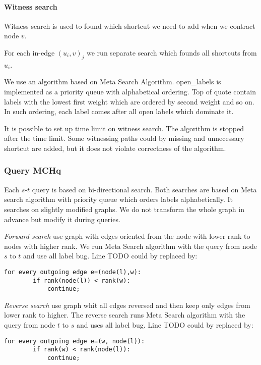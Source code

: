 \paragraph*{Witness search}

Witness search is used to found which shortcut we need to add when we contract 
node $v$.

For each in-edge $(u_i,v)_j$ we run separate search which founds all shortcuts 
from $u_i$.

We use an algorithm based on Meta Search Algorithm. 
open\_labels 
is implemented as a priority queue with alphabetical ordering. Top of quote contain labels with the lowest first weight which are ordered by second weight and so on. 
In such ordering, each label comes after all open labels which dominate it.

It is possible to set up time limit on witness search. The algorithm is stopped after the time limit. Some witnessing paths could by missing and unnecessary shortcut are added, but it does not violate correctness of the algorithm.

\subsubsection{Query MCHq}

Each $s$-$t$ query is based on bi-directional search.
Both searches are based on Meta search algorithm with priority queue which orders labels
alphabetically. It searches on slightly modified graphs. We do not transform the whole
graph in advance but modify it during queries.

\emph{Forward search} use graph with edges
oriented from the node with lower rank to nodes with higher rank.
We run Meta Search algorithm with the query from node $s$ to $t$ and use all label bug.
Line TODO could by replaced by:

\begin{lstlisting}[caption={MCHp},label=list:8-6,captionpos=t,float,abovecaptionskip=-\medskipamount]
    for every outgoing edge e=(node(l),w):
    	if rank(node(l)) < rank(w):
        	continue;
\end{lstlisting}

\emph{Reverse search} use graph whit all edges reversed and then keep only edges
from lower rank to higher. 
The reverse search runs Meta Search algorithm with the query from node $t$ to $s$ and uses all label bug.
Line TODO could by replaced by:

\begin{lstlisting}[caption={MCHp},label=list:8-6,captionpos=t,float,abovecaptionskip=-\medskipamount]
    for every outgoing edge e=(w, node(l)):
    	if rank(w) < rank(node(l)):
        	continue;
\end{lstlisting}


